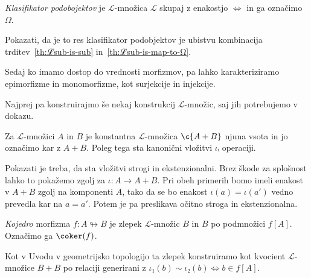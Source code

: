 \begin{konstrukcija}
  \emph{Klasifikator podobojektov} je \(ℒ\)-množica \(ℒ\) skupaj z enakostjo
  \(⇔\) in ga označimo \(Ω\).
\end{konstrukcija}
\begin{dokaz}
  Pokazati, da je to res klasifikator podobjektov je ubistvu kombinacija
  trditev~\ref{th:ℒsub-is-sub} in~\ref{th:ℒsub-is-map-to-Ω}.
\end{dokaz}

Sedaj ko imamo dostop do vrednosti morfizmov, pa lahko karakteriziramo
epimorfizme in monomorfizme, kot surjekcije in injekcije.

Najprej pa konstruirajmo še nekaj konstrukcij \(ℒ\)-množic, saj jih potrebujemo
v dokazu.
\begin{konstrukcija}
  Za \(ℒ\)-množici \(A\) in \(B\) je konstantna \(ℒ\)-množica \(\c{A+B}\) njuna
  vsota in jo označimo kar z \(A+B\). Poleg tega sta kanonični vložitvi \(ιᵢ\)
  operaciji.
\end{konstrukcija}
\begin{dokaz}
  Pokazati je treba, da sta vložitvi strogi in ekstenzionalni.
  Brez škode za splošnost lahko to pokažemo zgolj za \(ι : A → A+B\).
  Pri obeh primerih bomo imeli enakost v \(A+B\) zgolj na komponenti \(A\), tako
  da se bo enakost \(ι(a) = ι(a')\) vedno prevedla kar na \(a = a'\). Potem je
  pa preslikava očitno stroga in ekstenzionalna.
\end{dokaz}
\begin{konstrukcija}
  \emph{Kojedro} morfizma \(f : A ↬ B\) je zlepek \(ℒ\)-množic
  \(B\) in \(B\) po podmnožici \(f[A]\). Označimo ga \(\coker(f)\).
\end{konstrukcija}
\begin{dokaz}
  Kot v Uvodu v geometrijsko topologijo ta zlepek konstruiramo kot kvocient
  \(ℒ\)-množice \(B+B\) po relaciji generirani z \(ι₁(b) \sim ι₂(b) ⇔ b ∈ f[A]\).
\end{dokaz}


